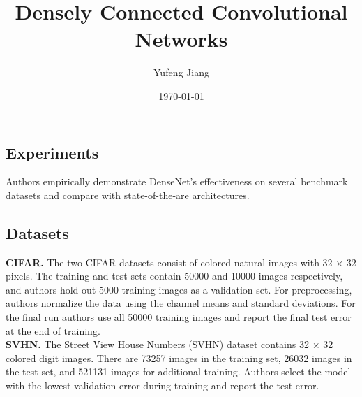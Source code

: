 \documentclass[10pt,letterpaper]{article}
\title{Densely Connected Convolutional Networks}
\author{Yufeng Jiang}
\date{\today}
\begin{document}
\maketitle
\balance
\begin{multicols}{2}
\section{Experiments}
Authors empirically demonstrate DenseNet's effectiveness on several benchmark datasets and compare with state-of-the-are architectures. \\
\subsection{Datasets}
{\bf CIFAR.} The two CIFAR datasets consist of colored natural images with 32 $\times$ 32 pixels. The training and test sets contain 50000 and 10000 images respectively, and authors hold out 5000 training images as a validation set. For preprocessing, authors normalize the data using the channel means and standard deviations. For the final run authors use all 50000 training images and report the final test error at the end of training.\\
{\bf SVHN.} The Street View House Numbers (SVHN) dataset contains 32 $\times$ 32 colored digit images. There are 73257 images in the training set, 26032 images in the test set, and 521131 images for additional training. Authors select the model with the lowest validation error during training and report the test error. \\
\end{multicols}
\end{document}
